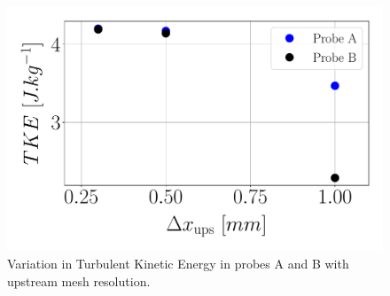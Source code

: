 \clearpage

\begin{figure}[ht]
	\centering
	\includegraphics[scale=0.28]{./part2_developments/figures_ch5_resolved_JICF/results_ics_mesh_convergence_probes/TKE_vs_dx_in_probes.pdf}
   \vspace*{-0.15in}
   \caption{Variation in Turbulent Kinetic Energy in probes A and B with upstream mesh resolution.}
   \label{fig:TKE_vs_dx_in_probes}
\end{figure}


